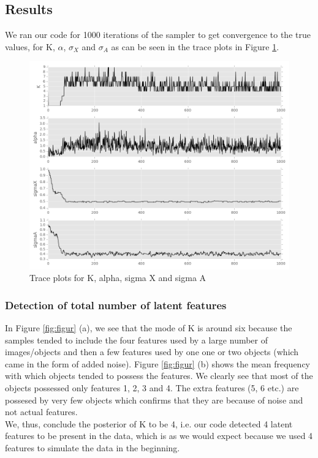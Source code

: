 \documentclass[11pt]{article}
\begin{document}
\subsection{Results}
We ran our code for 1000 iterations of the sampler to get convergence to the true values, for K, $\alpha$, $\sigma_{X}$ and $\sigma_{A}$ as can be seen in the trace plots in Figure \ref{fig:darr}.

\begin{figure}
\includegraphics[width=\linewidth]{data_files/trace_plots.png}
\caption {Trace plots for K, alpha, sigma X and sigma A}
\label{fig:darr}
\end{figure}

\subsubsection{Detection of total number of latent features}
In Figure \ref{fig:figur} (a), we see that the mode of K is around six because the samples tended to include the four features used by a large number of images/objects and then a few features used by one one or two objects (which came in the form of added noise). Figure \ref{fig:figur} (b) shows the mean frequency with which objects tended to possess the features. We clearly see that most of the objects possessed only features 1, 2, 3 and 4. The extra features (5, 6 etc.) are possesed by very few objects which confirms that they are because of noise and not actual features.\\

We, thus, conclude the posterior of K to be 4, i.e. our code detected 4 latent features to be present in the data, which is as we would expect because we used 4 features to simulate the data in the beginning.
\end{document}
